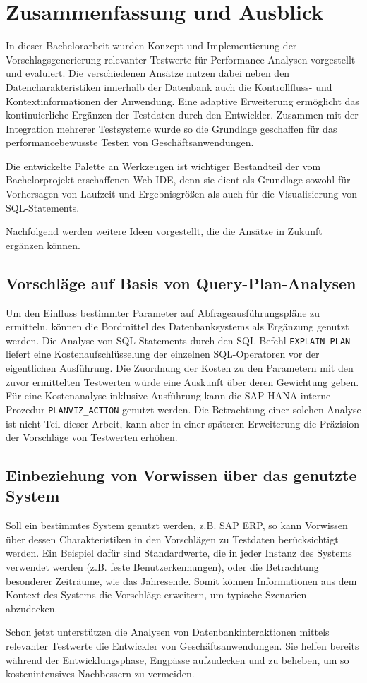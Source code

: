 \section{Zusammenfassung und Ausblick}\label{chap:conclusion}

In dieser Bachelorarbeit wurden Konzept und Implementierung der Vorschlagsgenerierung relevanter Testwerte für Performance-Analysen vorgestellt und evaluiert.
Die verschiedenen Ansätze nutzen dabei neben den Datencharakteristiken innerhalb der Datenbank auch die Kontrollfluss- und Kontextinformationen der Anwendung.
Eine adaptive Erweiterung ermöglicht das kontinuierliche Ergänzen der Testdaten durch den Entwickler.
Zusammen mit der Integration mehrerer Testsysteme wurde so die Grundlage geschaffen für das performancebewusste Testen von Geschäftsanwendungen.

Die entwickelte Palette an Werkzeugen ist wichtiger Bestandteil der vom Bachelorprojekt erschaffenen Web-IDE, denn sie dient als Grundlage sowohl für Vorhersagen von Laufzeit und Ergebnisgrößen als auch für die Visualisierung von SQL-Statements.

Nachfolgend werden weitere Ideen vorgestellt, die die Ansätze in Zukunft ergänzen können.

\subsection{Vorschläge auf Basis von Query-Plan-Analysen}
Um den Einfluss bestimmter Parameter auf Abfrageausführungspläne zu ermitteln, können die Bordmittel des Datenbanksystems als Ergänzung genutzt werden.
Die Analyse von SQL-Statements durch den SQL-Befehl \texttt{EXPLAIN PLAN} liefert eine Kostenaufschlüsselung der einzelnen SQL-Operatoren vor der eigentlichen Ausführung.
Die Zuordnung der Kosten zu den Parametern mit den zuvor ermittelten Testwerten würde eine Auskunft über deren Gewichtung geben.
Für eine Kostenanalyse inklusive Ausführung kann die SAP HANA interne Prozedur \texttt{PLANVIZ\_ACTION} genutzt werden.
Die Betrachtung einer solchen Analyse ist nicht Teil dieser Arbeit, kann aber in einer späteren Erweiterung die Präzision der Vorschläge von Testwerten erhöhen.

\subsection{Einbeziehung von Vorwissen über das genutzte System}
Soll ein bestimmtes System genutzt werden, z.B. SAP ERP, so kann Vorwissen über dessen Charakteristiken in den Vorschlägen zu Testdaten berücksichtigt werden.
Ein Beispiel dafür sind Standardwerte, die in jeder Instanz des Systems verwendet werden (z.B. feste Benutzerkennungen), oder die Betrachtung besonderer Zeiträume, wie das Jahresende.
Somit können Informationen aus dem Kontext des Systems die Vorschläge erweitern, um typische Szenarien abzudecken.


Schon jetzt unterstützen die Analysen von Datenbankinteraktionen mittels relevanter Testwerte die Entwickler von Geschäftsanwendungen.
Sie helfen bereits während der Entwicklungsphase, Engpässe aufzudecken und zu beheben, um so kostenintensives Nachbessern zu vermeiden.
